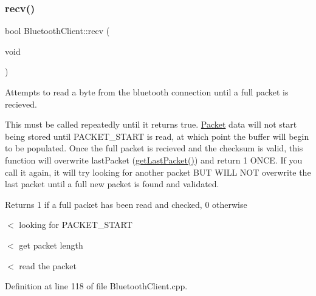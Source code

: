 \subsubsection{\texorpdfstring{recv()}{recv()}}
{\footnotesize\ttfamily bool Bluetooth\+Client\+::recv (\begin{DoxyParamCaption}\item[{void}]{ }\end{DoxyParamCaption})}



Attempts to read a byte from the bluetooth connection until a full packet is recieved. 

This must be called repeatedly until it returns true. \hyperlink{class_packet}{Packet} data will not start being stored until P\+A\+C\+K\+E\+T\+\_\+\+S\+T\+A\+RT is read, at which point the buffer will begin to be populated. Once the full packet is recieved and the checksum is valid, this function will overwrite last\+Packet (\hyperlink{class_bluetooth_client_ad009775f3bd7e30c53f2e1544bc83828}{get\+Last\+Packet()}) and return 1 O\+N\+CE. If you call it again, it will try looking for another packet B\+UT W\+I\+LL N\+OT overwrite the last packet until a full new packet is found and validated. \begin{DoxyReturn}{Returns}
1 if a full packet has been read and checked, 0 otherwise 
\end{DoxyReturn}
$<$ looking for P\+A\+C\+K\+E\+T\+\_\+\+S\+T\+A\+RT

$<$ get packet length

$<$ read the packet 

Definition at line 118 of file Bluetooth\+Client.\+cpp.


